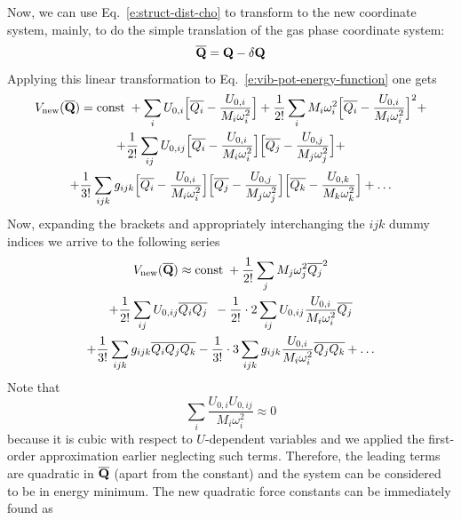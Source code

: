 \documentclass[b5paper,oneside,fleqn,11pt]{book}
\begin{document}
\begin{refsection}
Now, we can use Eq.~\eqref{e:struct-dist-cho} to transform to the new coordinate system, mainly,
to do the simple translation of the gas phase coordinate system:
%
\begin{equation} \label{e:struct-dist-cho-transl}
\overline{\bf Q} = {\bf Q} - \delta {\bf Q}
\end{equation}
%
Applying this linear transformation to Eq.~\eqref{e:vib-pot-energy-function} one gets
%
\begin{multline}   \label{exp}
V_{\rm new}(\overline{\bf Q}) = {\rm const}\;+\sum_i U_{0,i}\Big[\overline{Q_i}-\frac{U_{0,i}}{M_i\omega_i^2}\Big]
+ \frac{1}{2!} \sum_i M_i \omega_i^2 \Big[\overline{Q_i} - \frac{U_{0,i}}{M_i\omega_i^2}\Big]^2  +  \\
+ \frac{1}{2!} \sum_{ij} U_{0,ij} \Big[\overline{Q_i} - \frac{U_{0,i}}{M_i\omega_i^2}\Big] 
\Big[\overline{Q_j} - \frac{U_{0,j}}{M_j\omega_j^2}\Big] +  \\
+ \frac{1}{3!} \sum_{ijk} g_{ijk}  
\Big[\overline{Q_i} - \frac{U_{0,i}}{M_i\omega_i^2}\Big]
\Big[\overline{Q_j} - \frac{U_{0,j}}{M_j\omega_j^2}\Big]
\Big[\overline{Q_k} - \frac{U_{0,k}}{M_k\omega_k^2}\Big]  
+ \ldots
\end{multline}
%
Now, expanding the brackets and
appropriately interchanging the $ijk$ dummy indices we arrive to the following
series
%
\begin{multline}\label{exp2}
V_{\rm new}(\overline{\bf Q}) \approx {\rm const}\; 
+ \frac{1}{2!} \sum_j M_j \omega_j^2 \overline{Q_j}^2 \\
+ \frac{1}{2!} \sum_{ij} U_{0,ij} \overline{Q_i} \overline{Q_j} \;\;
 - \frac{1}{2!} \cdot 2 \sum_{ij} U_{0,ij} \frac{U_{0,i}}{M_i\omega_i^2} \overline{Q_j} \\
+ \frac{1}{3!} \sum_{ijk} g_{ijk} \overline{Q_i}\overline{Q_j}\overline{Q_k}  
- \frac{1}{3!} \cdot 3\sum_{ijk} g_{ijk} \frac{U_{0,i}}{M_i\omega_i^2} \overline{Q_j}\overline{Q_k} 
+ \ldots
\end{multline}
%
Note that
%
\begin{equation}
\sum_i \frac{ U_{0,i} U_{0,ij} }{M_i\omega_i^2}  \approx 0
\end{equation}
%
because it is cubic with respect to $U$\hyp{}dependent variables and we
applied the first\hyp{}order approximation earlier neglecting such terms. 
Therefore, the leading terms are quadratic in $\overline{\bf Q}$
(apart from the constant) and the system can be considered to be in energy minimum.
The new quadratic force constants can be immediately found as
%
\begin{equation} \label{e:force-const-cho}

\end{equation}
\end{refsection}
\end{document}
